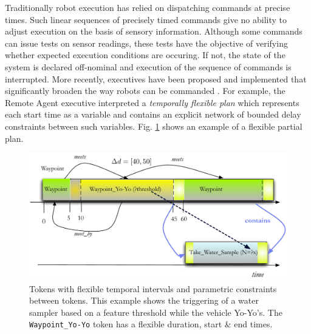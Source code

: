 Traditionally robot execution has relied on dispatching commands at
precise times. Such linear sequences of precisely timed commands give
no ability to adjust execution on the basis of sensory
information. Although some commands can issue tests on sensor
readings, these tests have the objective of verifying whether expected
execution conditions are occuring. If not, the state of the system is
declared off-nominal and execution of the sequence of commands is
interrupted. More recently, executives have been proposed and
implemented that significantly broaden the way robots can be commanded
\cite{mus98,alami:1998p820}. For example, the Remote Agent executive
interpreted a \textit{temporally flexible plan} which represents each
start time as a variable and contains an explicit network of bounded
delay constraints between such
variables. Fig. \ref{fig:flex-timelines} shows an example of a
flexible partial plan.

\begin{figure}[!htb]
\centering
\includegraphics[scale=0.35]{figs/flexible-timelines.pdf}
\caption{\small Tokens with flexible temporal intervals and parametric
  constraints between tokens. This example shows the triggering of a
  water sampler based on a feature threshold while the vehicle
  Yo-Yo's. The \texttt{Waypoint\_Yo-Yo} token has a flexible duration,
  start \& end times.}
\label{fig:flex-timelines}
\end{figure}

